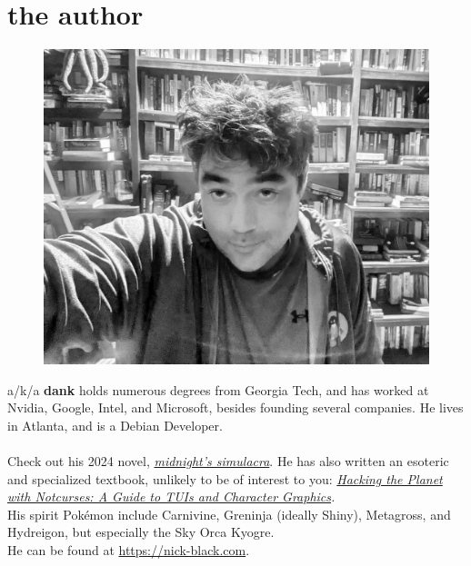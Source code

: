 \clearpage
\openany
\pagestyle{empty}
\chapter*{the author}
\nopagecolor
\begin{figure}[!tbp]
  \centering
  \includegraphics[width=\textwidth]{images/arrayfire.jpg}
\end{figure}
\bigskip
\noindent\textbf{\theauthor} a/k/a \textbf{dank} holds numerous degrees from Georgia Tech, and has worked
at Nvidia, Google, Intel, and Microsoft, besides founding several companies.
He lives in Atlanta, and is a Debian Developer.\\
\\
\noindent{}Check out his 2024 novel, \textit{\href{https://www.amazon.com/midnights-simulacra-Nick-Black/dp/B0CSVJZB4R}{midnight's simulacra}}.
He has also written an esoteric and specialized textbook, unlikely to be of interest to you: \textit{\href{https://www.amazon.com/Hacking-Planet-Notcurses-Character-Graphics/dp/B086PNVNC9}{Hacking the Planet with Notcurses: A Guide to TUIs and Character Graphics}.}
\\
His spirit Pokémon include Carnivine, Greninja (ideally Shiny), Metagross, and Hydreigon,
 but especially the Sky Orca Kyogre.\\

\bigskip\noindent{}He can be found at \url{https://nick-black.com}.
